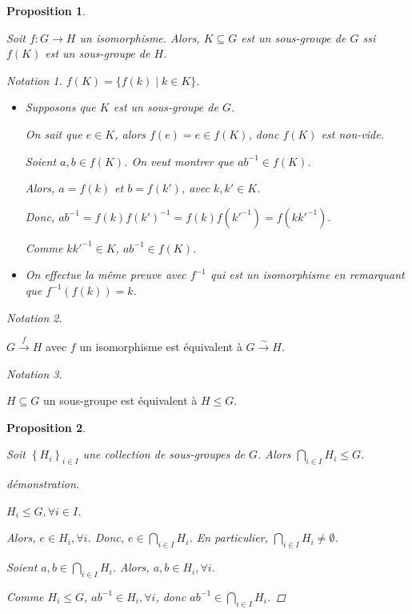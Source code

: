 \documentclass{report}
\newtheorem*{prop}{Proposition}
\theoremstyle{definition}
\theoremstyle{remark}
\newtheorem*{nota}{Notation}
\begin{document}
	\begin{prop}~

		Soit $f:G \to H$ un isomorphisme. Alors, $K \subseteq G$ est un sous-groupe de $G$ ssi $f(K)$ est un sous-groupe de $H$.
		\begin{nota}
			$f(K) = \{f(k) \mid k \in K\}$.
		\end{nota}

		\begin{itemize}
			\item[$(\Rightarrow)$] Supposons que $K$ est un sous-groupe de $G$.

			On sait que $e \in K$, alors $f(e)=e \in f(K)$, donc $f(K)$ est non-vide.

			Soient $a,b \in f(K)$. On veut montrer que $ab^{-1} \in f(K)$.

			Alors, $a=f(k)$ et $b=f(k')$, avec $k,k' \in K$.

			Donc, $ab^{-1} = f(k)f(k')^{-1} = f(k)f(k'^{-1}) = f(kk'^{-1})$.

			Comme $kk'^{-1} \in K$, $ab^{-1} \in f(K)$.
			\item[$(\Leftarrow)$] On effectue la m\^eme preuve avec $f^{-1}$ qui est un isomorphisme en remarquant que $f^{-1}(f(k))=k$.
		\end{itemize}
	\end{prop}
	\begin{nota}
		~

		$G\xrightarrow{f}H$ avec $f$ un isomorphisme est \'equivalent \`a $G\xrightarrow{\sim}H$.
	\end{nota}
	\begin{nota}
		~

		$H \subseteq G$ un sous-groupe est \'equivalent \`a $H \leq G$.
	\end{nota}
	\begin{prop}
		~

		Soit $\left\lbrace H_i \right\rbrace_{i \in I}$ une collection de sous-groupes de $G$. Alors $\bigcap\limits_{i \in I}H_i \leq G$.
		\begin{proof}[d\'emonstration]~

			$H_i \leq G, \forall i \in I$.

			Alors, $e \in H_i, \forall i$. Donc, $e \in \bigcap\limits_{i \in I}H_i$. En particulier, $\bigcap\limits_{i \in I}H_i \neq \emptyset$.

			Soient $a,b\in \bigcap\limits_{i \in I}H_i$. Alors, $a,b \in H_i, \forall i$.

			Comme $H_i \leq G$, $ab^{-1} \in H_i, \forall i$, donc $ab^{-1} \in \bigcap\limits_{i \in I}H_i$.
		\end{proof}
	\end{prop}
\end{document}
